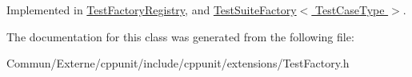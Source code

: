Implemented in \hyperlink{class_test_factory_registry_a75fd01e6d565fb0f576ed1a887655089}{Test\+Factory\+Registry}, and \hyperlink{class_test_suite_factory_a0790b11de1543fa894acd7069fd1f327}{Test\+Suite\+Factory$<$ Test\+Case\+Type $>$}.



The documentation for this class was generated from the following file\+:\begin{DoxyCompactItemize}
\item 
Commun/\+Externe/cppunit/include/cppunit/extensions/Test\+Factory.\+h\end{DoxyCompactItemize}
